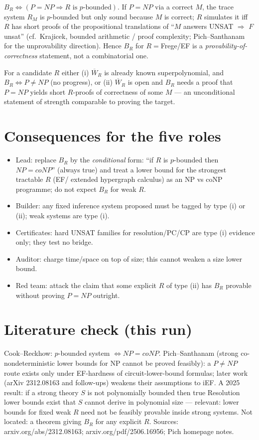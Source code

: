 \documentclass{article}
\begin{document}
\begin{prop}
$B_R\iff(P=NP\Rightarrow R\text{ is $p$-bounded})$. If $P=NP$ via a correct $M$, the trace system $R_M$ is $p$-bounded but only sound because $M$ is correct; $R$ simulates it iff $R$ has short proofs of the propositional translations of ``$M$ answers UNSAT $\Rightarrow$ $F$ unsat'' (cf.\ Krajicek, bounded arithmetic / proof complexity; Pich--Santhanam for the unprovability direction). Hence $B_R$ for $R=$Frege/EF is a \emph{provability-of-correctness} statement, not a combinatorial one.\end{prop}

\begin{prop}
For a candidate $R$ either (i) $\overline W_R$ is already known superpolynomial, and $B_R\iff P\ne NP$ (no progress), or (ii) $\overline W_R$ is open and $B_R$ needs a proof that $P=NP$ yields short $R$-proofs of correctness of some $M$ --- an unconditional statement of strength comparable to proving the target.
\end{prop}

\section*{Consequences for the five roles}
\begin{itemize}
\item Lead: replace $B_R$ by the \emph{conditional} form: ``if $R$ is $p$-bounded then $NP=coNP$'' (always true) and treat a lower bound for the strongest tractable $R$ (EF/ extended hypergraph calculus) as an NP vs coNP programme; do not expect $B_R$ for weak $R$.
\item Builder: any fixed inference system proposed must be tagged by type (i) or (ii); weak systems are type (i).
\item Certificates: hard UNSAT families for resolution/PC/CP are type (i) evidence only; they test no bridge.
\item Auditor: charge time/space on top of size; this cannot weaken a size lower bound.
\item Red team: attack the claim that some explicit $R$ of type (ii) has $B_R$ provable without proving $P=NP$ outright.
\end{itemize}

\section*{Literature check (this run)}
Cook--Reckhow: $p$-bounded system $\iff NP=coNP$. Pich--Santhanam (strong co-nondeterministic lower bounds for NP cannot be proved feasibly): a $P\ne NP$ route exists only under EF-hardness of circuit-lower-bound formulas; later work (arXiv 2312.08163 and follow-ups) weakens their assumptions to iEF. A 2025 result: if a strong theory $S$ is not polynomially bounded then true Resolution lower bounds exist that $S$ cannot derive in polynomial size --- relevant: lower bounds for fixed weak $R$ need not be feasibly provable inside strong systems. Not located: a theorem giving $B_R$ for any explicit $R$. Sources: arxiv.org/abs/2312.08163; arxiv.org/pdf/2506.16956; Pich homepage notes.
\end{document}
